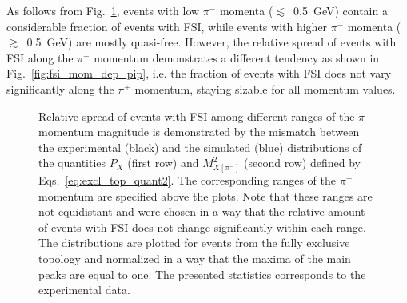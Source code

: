 As follows from Fig.~\ref{fig:fsi_mom_dep_pim}, events with low $\pi^{-}$ momenta ($\lesssim$~0.5~GeV) contain a considerable fraction of events with FSI, while events with higher $\pi^{-}$ momenta ($\gtrsim$~0.5~GeV) are mostly quasi-free. However, the relative spread of events with FSI along the $\pi^{+}$ momentum demonstrates a different tendency as shown in Fig.~\ref{fig:fsi_mom_dep_pip}, i.e. the fraction of events with FSI does not vary significantly along the $\pi^{+}$ momentum, staying sizable for all momentum values.

\afterpage{\clearpage}
\begin{figure}[!ht]
\begin{center}
\end{center}
\caption{\small Relative spread of events with FSI among different ranges of the $\pi^{-}$ momentum magnitude is demonstrated by the mismatch between the experimental (black) and the simulated (blue) distributions of the quantities $P_{X}$ (first row) and $M^{2}_{X[\pi^{-}]}$ (second row) defined by Eqs.~\eqref{eq:excl_top_quant2}. The corresponding ranges of the $\pi^{-}$ momentum are specified above the plots. Note that these ranges are not equidistant and were chosen in a way that the relative amount of events with FSI does not change significantly within each range. The distributions are plotted for events from the fully exclusive topology and normalized in a way that the maxima of the main peaks are equal to one. The presented statistics corresponds to the experimental data.}
\label{fig:fsi_mom_dep_pim}
\end{figure}


